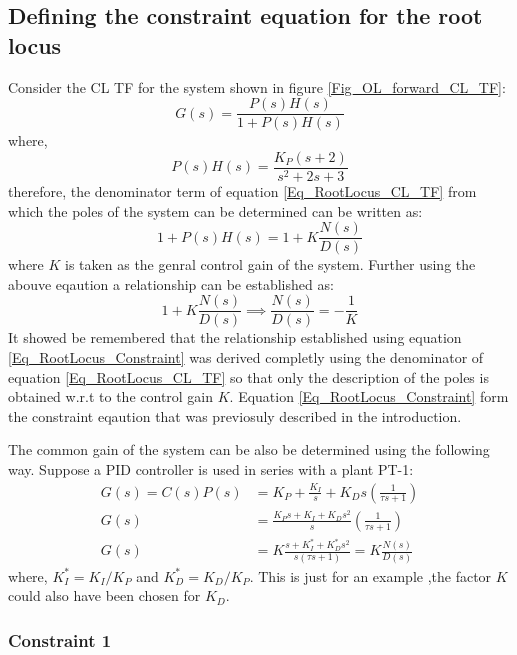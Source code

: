 \subsection{Defining the constraint equation for the root locus}

Consider the CL TF for the system shown in figure \ref{Fig_OL_forward_CL_TF}:
\begin{equation}\label{Eq_RootLocus_CL_TF}
	G(s) = \frac{P(s)H(s)}{1 + P(s)H(s)}
\end{equation}
where,
\begin{equation}
	P(s)H(s) = \frac{K_P (s+2)}{s^2 + 2s + 3}
\end{equation}
therefore, the denominator term of equation \ref{Eq_RootLocus_CL_TF} from which the poles of the system can be determined can be written as:
\begin{equation}
	1 + P(s)H(s) = 1 +  K \frac{N(s)}{D(s)}
\end{equation}
where $K$ is taken as the genral control gain of the system. Further using the abouve eqaution a relationship can be established as:
\begin{equation} \label{Eq_RootLocus_Constraint}
	1 +  K \frac{N(s)}{D(s)} \implies \frac{N(s)}{D(s)} = -\frac{1}{K}
\end{equation}
It showed be remembered that the relationship established using equation \eqref{Eq_RootLocus_Constraint} was derived completly using the denominator of equation \eqref{Eq_RootLocus_CL_TF} so that only the description of the poles is obtained w.r.t to the control gain $K$. Equation \eqref{Eq_RootLocus_Constraint} form the constraint eqaution that was previosuly described in the introduction.

The common gain of the system can be also be determined using the following way. Suppose a PID controller is used in series with a plant PT-1:
\begin{align*}
	G(s) = C(s)P(s) &= K_P + \frac{K_I}{s} + K_D s \left( \frac{1}{\tau s + 1} \right) \\
	G(s) &= \frac{K_P s + K_I + K_D s^2}{s} \left( \frac{1}{\tau s + 1} \right) \\
	G(s) &= K \frac{s + K_I^{*} + K_D^{*} s^2}{s(\tau s + 1)} = K \frac{N(s)}{D(s)}
\end{align*}
where, $K_I^{*} = K_I / K_P$ and $K_D^{*} = K_D / K_P$. This is just for an example ,the factor $K$ could also have been chosen for $K_D$.

\subsubsection{Constraint 1}

